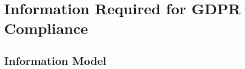 \chapter{Information Required for GDPR Compliance}
\label{chapter:information}

\section{Information Model}\label{sec:info:model}